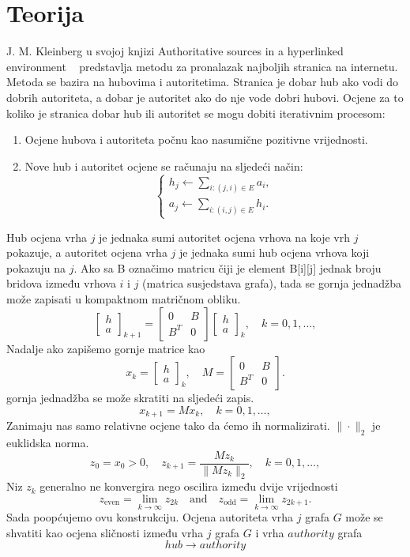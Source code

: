 \documentclass[12pt, letterpaper]{article}
\numberwithin{figure}{section}
\begin{document}
\section{Teorija}
 J. M. Kleinberg u svojoj knjizi Authoritative sources in a hyperlinked environment ~\cite{kleinberg1999} predstavlja metodu za pronalazak najboljih stranica na internetu. Metoda se bazira na hubovima i autoritetima. Stranica je dobar hub ako vodi do dobrih autoriteta, a dobar je autoritet ako do nje vode dobri hubovi. Ocjene za to koliko je stranica dobar hub ili autoritet se mogu dobiti iterativnim procesom:
 \begin{enumerate}
  \item Ocjene hubova i autoriteta počnu kao nasumične pozitivne vrijednosti.
  \item Nove hub i autoritet ocjene se računaju na sljedeći način:
  \[
\begin{cases}
h_j \leftarrow \sum_{i:(j,i)\in E} a_i, \\
a_j \leftarrow \sum_{i:(i,j)\in E} h_i.
\end{cases}
\]
\end{enumerate}
Hub ocjena vrha $j$ je jednaka sumi autoritet ocjena vrhova na koje vrh $j$ pokazuje, a autoritet ocjena vrha $j$ je jednaka sumi hub ocjena vrhova koji pokazuju na $j$. Ako sa B označimo matricu čiji je element B[i][j] jednak broju bridova između vrhova $i$ i $j$ (matrica susjedstava grafa), tada se gornja jednadžba može zapisati u kompaktnom matričnom obliku.
\[
\begin{bmatrix}
h \\
a
\end{bmatrix}_{k+1}
=
\begin{bmatrix}
0 & B \\
B^T & 0
\end{bmatrix}
\begin{bmatrix}
h \\
a
\end{bmatrix}_{k},
\quad k = 0, 1, \dots,
\]
Nadalje ako zapišemo gornje matrice kao 
\[
x_k = \begin{bmatrix}
h \\
a
\end{bmatrix}_{k},
\quad
M = \begin{bmatrix}
0 & B \\
B^T & 0
\end{bmatrix}.
\]
gornja jednadžba se može skratiti na sljedeći zapis.
\[
x_{k+1} = M x_k, \quad k = 0, 1, \dots,
\]
Zanimaju nas samo relativne ocjene tako da ćemo ih normalizirati. $\|\cdot\|_2$ je euklidska norma.
\begin{equation}
z_0 = x_0 > 0, \quad z_{k+1} = \frac{M z_k}{\|M z_k\|_2}, \quad k = 0, 1, \dots,
\end{equation}
Niz $z_k$ generalno ne konvergira nego oscilira između dvije vrijednosti
\[
z_{\text{even}} = \lim_{k\to\infty} z_{2k} \quad \text{and} \quad z_{\text{odd}} = \lim_{k\to\infty} z_{2k+1}.
\]
Sada poopćujemo ovu konstrukciju. Ocjena autoriteta vrha $j$ grafa $G$ može se shvatiti kao ocjena sličnosti između vrha $j$ grafa $G$ i vrha $\mathit{authority}$ grafa
\[
\mathit{hub} \longrightarrow \mathit{authority}
\]
\end{document}
